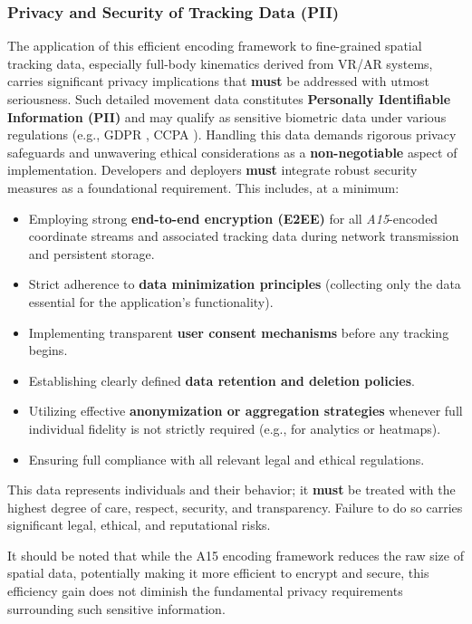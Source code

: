 \documentclass[10pt]{article}
\def\AAAB{\textit{A15}}
\begin{document}
\subsubsection{Privacy and Security of Tracking Data (PII)}\label{subsubsec-limits-privacy}
The application of this efficient encoding framework to fine-grained spatial tracking data, especially full-body kinematics derived from VR/AR systems, carries significant privacy implications that \textbf{must} be addressed with utmost seriousness. Such detailed movement data constitutes \textbf{Personally Identifiable Information (PII)} and may qualify as sensitive biometric data under various regulations (e.g., GDPR \cite{GDPR-2016}, CCPA \cite{CCPA-2018}). Handling this data demands rigorous privacy safeguards and unwavering ethical considerations as a \textbf{non-negotiable} aspect of implementation. Developers and deployers \textbf{must} integrate robust security measures as a foundational requirement. This includes, at a minimum:
\begin{itemize} \itemsep0pt
    \item Employing strong \textbf{end-to-end encryption (E2EE)} for all \AAAB{}-encoded coordinate streams and associated tracking data during network transmission and persistent storage.
    \item Strict adherence to \textbf{data minimization principles} (collecting only the data essential for the application's functionality).
    \item Implementing transparent \textbf{user consent mechanisms} before any tracking begins.
    \item Establishing clearly defined \textbf{data retention and deletion policies}.
    \item Utilizing effective \textbf{anonymization or aggregation strategies} whenever full individual fidelity is not strictly required (e.g., for analytics or heatmaps).
    \item Ensuring full compliance with all relevant legal and ethical regulations.
\end{itemize}
This data represents individuals and their behavior; it \textbf{must} be treated with the highest degree of care, respect, security, and transparency. Failure to do so carries significant legal, ethical, and reputational risks.

It should be noted that while the A15 encoding framework reduces the raw size of spatial data, potentially making it more efficient to encrypt and secure, this efficiency gain does not diminish the fundamental privacy requirements surrounding such sensitive information.
\end{document}

